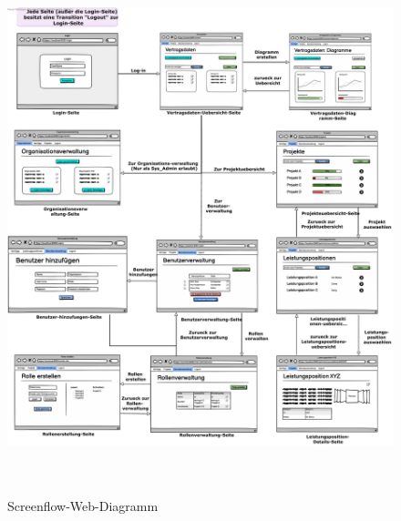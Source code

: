 \begin{figure}[ht]
	\centering
	\includegraphics[width=16cm, height=15.5cm]{img/mockup_web/Screenflow_Web.pdf}
	\caption{Screenflow-Web-Diagramm}
\end{figure}

\clearpage
